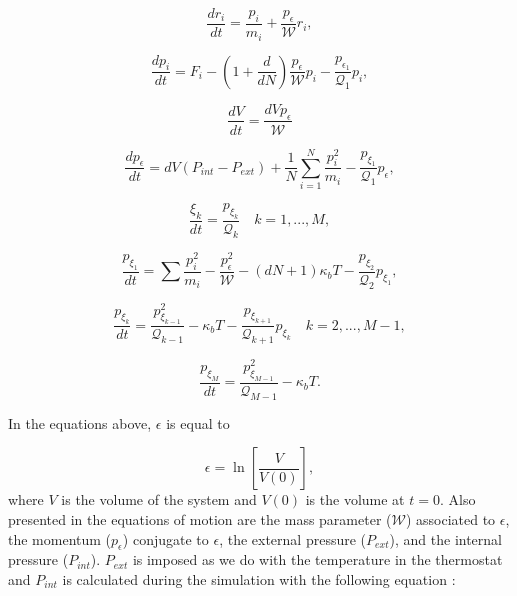 \begin{equation}
\frac{dr_{i}}{dt} = \frac{p_i}{m_i} + \frac{p_{\epsilon}}{\mathcal{W}} r_i,
\end{equation}

\begin{equation}
\frac{dp_{i}}{dt} = F_i  - \left(1 + \frac{d}{dN}\right) \frac{p_{\epsilon}}{\mathcal{W}} p_{i} - \frac{p_{\epsilon _{1}}}{\mathcal{Q} _1} p_{i},
\end{equation}

\begin{equation}
\frac{dV}{dt} = \frac{d V p_{\epsilon}}{\mathcal{W} }
\end{equation}

\begin{equation}
\frac{dp_{\epsilon}}{dt} = dV (    P_{int} -P_{ext}) + \frac{1}{N} \sum_{i=1}^{N} \frac{p_{i}^{2}}{m_i} - \frac{p_{\xi _{1}}}{{\mathcal{Q} _1}}p_{\epsilon},
\end{equation}

\begin{equation}
\frac{\xi _{k}}{dt} = \frac{p_{\xi _k}}{\mathcal{Q} _{k}} \quad k = 1,...,M ,
\end{equation}

\begin{equation}
\frac{p_{\xi _1}}{dt} = \sum \frac{p_{i}^{2}}{m_{i}} - \frac{p_{\epsilon}^{2}}{\mathcal{W}} -  (dN +1)\kappa_{b}T -\frac{p_{\xi _{2}}}{\mathcal{Q} _2}p_{\xi _{1}},
\end{equation}

\begin{equation}
\frac{p_{\xi _k}}{dt} = \frac{p_{\xi _{k -1}}^{2}}{\mathcal{Q} _{k-1}} - \kappa_{b}T - \frac{p_{\xi _{k+1}}}{\mathcal{Q} _{k+1}}p_{\xi _{k}} \quad k = 2,...,M-1 ,
\end{equation}

\begin{equation}
\frac{p_{\xi _M}}{dt} = \frac{ p_{\xi _{M-1}}^{2}}{\mathcal{Q} _{M-1}} - \kappa_{b}T .
\end{equation}

In the equations above, $\epsilon$ is equal to

\begin{equation}
\epsilon = \ln \left[\frac{V}{V(0)}\right],
\end{equation}
where $V$ is the volume of the system and $V(0)$ is the volume at $t=0$. Also presented in the equations of motion are the mass parameter ($\mathcal{W}$) associated to $\epsilon$, the momentum ($p_{\epsilon}$) conjugate to $\epsilon$, the external pressure ($P_{ext}$), and the internal pressure ($P_{int}$). $P_{ext}$ is imposed as we do with the temperature in the thermostat and $P_{int}$ is calculated during the simulation with the following equation \cite{tuckerman}:


